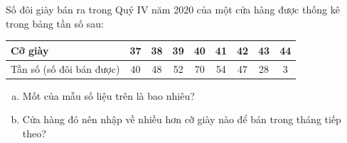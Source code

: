 \begin{bt}
	Số đôi giày bán ra trong Quý IV năm 2020 của một cửa hàng được thống kê trong bảng tần số sau:
	\begin{center}
	\begin{tabular}{|l|c|c|c|c|c|c|c|c|}
		\hline
		Cỡ giày & 37 & 38 & 39 & 40 & 41 & 42 & 43 & 44 \\
		\hline
		Tần số (số đôi bán được) & 40 & 48 & 52 & 70 & 54 & 47 & 28 & 3 \\
		\hline
	\end{tabular}
	\end{center}
	\begin{enumerate}[a)]
		\item Mốt của mẫu số liệu trên là bao nhiêu?
		\item Cửa hàng đó nên nhập về nhiều hơn cỡ giày nào để bán trong tháng tiếp theo?
	\end{enumerate}
\end{bt}

